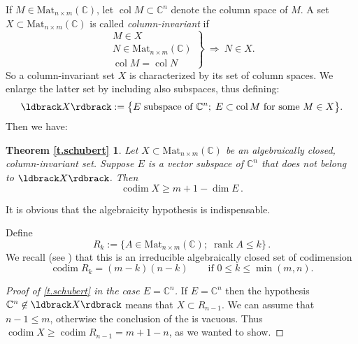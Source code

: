 \documentclass[10pt, a4paper]{amsart}
\theoremstyle{plain}
\newtheorem*{repeatedthm}{Theorem \ref{t.schubert}}
\theoremstyle{definition}
\theoremstyle{remark}
\theoremstyle{note}
\numberwithin{equation}{section}
\begin{document}
If $M \in {\mathrm{Mat}}_{n \times m}({\mathbb{C}})$, let $\operatorname{col} M \subset {\mathbb{C}}^n$ denote the column space of $M$.
A set $X \subset {\mathrm{Mat}}_{n \times m}({\mathbb{C}})$ is called \emph{column-invariant}
if 
$$
\left.
\begin{array}{c}
M \in X \\ 
N \in {\mathrm{Mat}}_{n \times m}({\mathbb{C}})\\
\operatorname{col} M = \operatorname{col} N
\end{array}
\right\} \ \Rightarrow \ 
N \in X.
$$
So a column-invariant set $X$ is characterized by its set of column spaces.
We enlarge the latter set by including also subspaces, thus defining:
$$
\ldbrack X \rdbrack := \big\{ E \text{ subspace of } {\mathbb{C}}^n ; \; E \subset \operatorname{col} M \text{ for some } M \in X \big\}.
$$
Then we have:

\begin{repeatedthm} 
Let $X \subset {\mathrm{Mat}}_{n \times m}({\mathbb{C}})$ be an algebraically closed, column-invariant set.
Suppose $E$ is a vector subspace of ${\mathbb{C}}^n$
that does not belong to $\ldbrack X \rdbrack$.
Then
$$
\operatorname{codim} X \ge m + 1 - \dim E \, .
$$
\end{repeatedthm}

It is obvious that the algebraicity hypothesis is indispensable. 

\medskip

Define
\begin{equation}\label{e.R_k}
R_k := \big \{ A \in {\mathrm{Mat}}_{n \times m}({\mathbb{C}}) ; \; \operatorname{rank} A \le k \big\} \, .
\end{equation}
We recall (see \cite[Prop.~12.2]{Harris}) that 
this is an irreducible algebraically closed set of codimension
\begin{equation}\label{e.cod_R_k}
\operatorname{codim} R_k = (m-k)(n-k) \qquad \text{if } 0 \le k \le \min(m,n).
\end{equation}

\begin{proof}[Proof of \cref{t.schubert} in the case $E = {\mathbb{C}}^n$]
If $E = {\mathbb{C}}^n$ then the hypothesis ${\mathbb{C}}^n \not\in \ldbrack X \rdbrack$
means that $X \subset R_{n-1}$.
We can assume that $n-1 \le m$, otherwise the conclusion of the 
\lcnamecref{t.schubert} is vacuous.
Thus $\operatorname{codim} X \ge \operatorname{codim} R_{n-1} = m + 1 - n$, as we wanted to show.
\end{proof}
\end{document}
